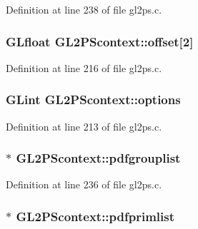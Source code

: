 Definition at line 238 of file gl2ps.\+c.

\hypertarget{struct_g_l2_p_scontext_af07d943c1933978abc1b3158deb7bdee}{}
\subsubsection[{offset}]{\setlength{\rightskip}{0pt plus 5cm}G\+Lfloat G\+L2\+P\+Scontext\+::offset\mbox{[}2\mbox{]}}\label{struct_g_l2_p_scontext_af07d943c1933978abc1b3158deb7bdee}


Definition at line 216 of file gl2ps.\+c.

\hypertarget{struct_g_l2_p_scontext_a85ffa3220ca660484dbd86e038b5b137}{}
\subsubsection[{options}]{\setlength{\rightskip}{0pt plus 5cm}G\+Lint G\+L2\+P\+Scontext\+::options}\label{struct_g_l2_p_scontext_a85ffa3220ca660484dbd86e038b5b137}


Definition at line 213 of file gl2ps.\+c.

\hypertarget{struct_g_l2_p_scontext_a25a5e8b6faa99f105a2b259550863fb1}{}
\subsubsection[{pdfgrouplist}]{ $\ast$ G\+L2\+P\+Scontext\+::pdfgrouplist}\label{struct_g_l2_p_scontext_a25a5e8b6faa99f105a2b259550863fb1}


Definition at line 236 of file gl2ps.\+c.

\hypertarget{struct_g_l2_p_scontext_acab98dc143b241b9fff8ec6b66b490be}{}
\subsubsection[{pdfprimlist}]{$\ast$ G\+L2\+P\+Scontext\+::pdfprimlist}\label{struct_g_l2_p_scontext_acab98dc143b241b9fff8ec6b66b490be}


